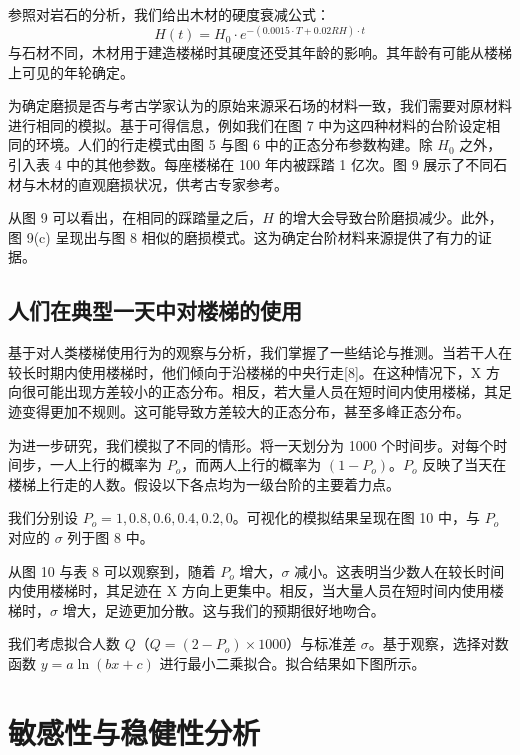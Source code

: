 \documentclass[11pt,a4paper]{ctexart}
\begin{document}
参照对岩石的分析，我们给出木材的硬度衰减公式：
\begin{equation}
H(t)=H_0\cdot e^{-(0.0015\cdot T+0.02RH)\cdot t} \tag{4.13}
\end{equation}
与石材不同，木材用于建造楼梯时其硬度还受其年龄的影响。其年龄有可能从楼梯上可见的年轮确定。

为确定磨损是否与考古学家认为的原始来源采石场的材料一致，我们需要对原材料进行相同的模拟。基于可得信息，例如我们在图 7 中为这四种材料的台阶设定相同的环境。人们的行走模式由图 5 与图 6 中的正态分布参数构建。除 \(H_0\) 之外，引入表 4 中的其他参数。每座楼梯在 100 年内被踩踏 1 亿次。图 9 展示了不同石材与木材的直观磨损状况，供考古专家参考。

从图 9 可以看出，在相同的踩踏量之后，\(H\) 的增大会导致台阶磨损减少。此外，图 9(c) 呈现出与图 8 相似的磨损模式。这为确定台阶材料来源提供了有力的证据。

\subsection{人们在典型一天中对楼梯的使用}

基于对人类楼梯使用行为的观察与分析，我们掌握了一些结论与推测。当若干人在较长时期内使用楼梯时，他们倾向于沿楼梯的中央行走[8]。在这种情况下，X 方向很可能出现方差较小的正态分布。相反，若大量人员在短时间内使用楼梯，其足迹变得更加不规则。这可能导致方差较大的正态分布，甚至多峰正态分布。

为进一步研究，我们模拟了不同的情形。将一天划分为 1000 个时间步。对每个时间步，一人上行的概率为 \(P_o\)，而两人上行的概率为 \((1-P_o)\)。\(P_o\) 反映了当天在楼梯上行走的人数。假设以下各点均为一级台阶的主要着力点。

我们分别设 \(P_o=1,0.8,0.6,0.4,0.2,0\)。可视化的模拟结果呈现在图 10 中，与 \(P_o\) 对应的 \(\sigma\) 列于图 8 中。

从图 10 与表 8 可以观察到，随着 \(P_o\) 增大，\(\sigma\) 减小。这表明当少数人在较长时间内使用楼梯时，其足迹在 X 方向上更集中。相反，当大量人员在短时间内使用楼梯时，\(\sigma\) 增大，足迹更加分散。这与我们的预期很好地吻合。

我们考虑拟合人数 \(Q\)（\(Q=(2-P_o)\times 1000\)）与标准差 \(\sigma\)。基于观察，选择对数函数 \(y=a\ln(bx+c)\) 进行最小二乘拟合。拟合结果如下图所示。

\section{敏感性与稳健性分析}
\end{document}
